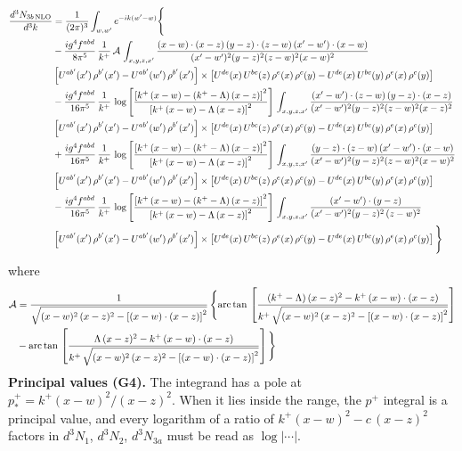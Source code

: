 \documentclass[9pt]{article}
\numberwithin{equation}{section}
\begin{document}
\begin{align}
\frac{d^{3}N_{3b\,\rm NLO}}{d^{3}k} & =\frac{1}{(2\pi)^{3}}\int_{w,w'}e^{-ik(w'-w)}\Bigg\{\notag \\ &-\frac{ig^{4}f^{abd}}{8\pi^{5}}\,\frac{1}{k^{+}}\,\mathcal{A}\,\int_{x,y,z,x'}
\frac{(x-w)\cdot(x-z)\,(y-z)\cdot(z-w)\,(x'-w')\cdot(x-w)}{(x'-w')^{2}(y-z)^{2}(z-w)^{2}(x-w)^{2}}\notag \\ & \left[U^{ab'}(x')\,\rho^{b'}(x')-U^{ab'}(w')\, \rho^{b'}(x')\right]\times \left[U^{de}(x)\,U^{bc}(z)\, \rho^{e}(x)\,\rho^{c}(y)-U^{de}(x)\,U^{bc}(y)\,\rho^{e}(x)\,\rho^{c}(y)\right]\notag \\ & -\frac{ig^{4}f^{abd}}{16\pi^{5}}\,\frac{1}{k^{+}}\,\log{\left[\frac{\left[k^{+}\,(x-w)-(k^{+}-\Lambda)\,(x-z)\right]^{2}}{\left[k^{+}\,(x-w)-\Lambda\,(x-z)\right]^{2}}\right]}\,\int_{x,y,z,x'}
\frac{(x'-w')\cdot(z-w)\,(y-z)\cdot(x-z)}{(x'-w')^{2}(y-z)^{2}(z-w)^{2}(x-z)^{2}}\notag \\
&\left[U^{ab'}(x')\,\rho^{b'}(x')-U^{ab'}(w')\, \rho^{b'}(x')\right]\times \left[U^{de}(x)\,U^{bc}(z)\, \rho^{e}(x)\,\rho^{c}(y)-U^{de}(x)\,U^{bc}(y)\,\rho^{e}(x)\,\rho^{c}(y)\right]\notag \\ &+ \frac{ig^{4}f^{abd}}{16\pi^{5}}\,\frac{1}{k^{+}}\,\log{\left[\frac{\left[k^{+}\,(x-w)-(k^{+}-\Lambda)\,(x-z)\right]^{2}}{\left[k^{+}\,(x-w)-\Lambda\,(x-z)\right]^{2}}\right]}\,\int_{x,y,z,x'}
\frac{(y-z)\cdot(z-w)\,(x'-w')\cdot(x-w)}{(x'-w')^{2}(y-z)^{2}(z-w)^{2}(x-w)^{2}}\notag \\ 
& \left[U^{ab'}(x')\,\rho^{b'}(x')-U^{ab'}(w')\, \rho^{b'}(x')\right]\times \left[U^{de}(x)\,U^{bc}(z)\, \rho^{e}(x)\,\rho^{c}(y)-U^{de}(x)\,U^{bc}(y)\,\rho^{e}(x)\,\rho^{c}(y)\right]\notag \\ & -\frac{ig^{4}f^{abd}}{16\pi^{5}}\,\frac{1}{k^{+}}\,\log{\left[\frac{\left[k^{+}\,(x-w)-(k^{+}-\Lambda)\,(x-z)\right]^{2}}{\left[k^{+}\,(x-w)-\Lambda\,(x-z)\right]^{2}}\right]}\,\int_{x,y,z,x'}
\frac{(x'-w')\cdot(y-z)}{(x'-w')^{2}(y-z)^{2}\,(z-w)^{2}}\notag \\ & \left[U^{ab'}(x')\,\rho^{b'}(x')-U^{ab'}(w')\, \rho^{b'}(x')\right]\times \left[U^{de}(x)\,U^{bc}(z)\, \rho^{e}(x)\,\rho^{c}(y)-U^{de}(x)\,U^{bc}(y)\,\rho^{e}(x)\,\rho^{c}(y)\right]\Bigg\}
\end{align}
where 
\begin{align}
\mathcal{A} & = \frac{1}{\sqrt{(x-w)^{2}\,(x-z)^{2}-\left[(x-w)\cdot (x-z)\right]^{2}}}\, \Bigg\{\mathrm{arc\,tan}\,\left[\frac{(k^{+}-\Lambda)\,(x-z)^{2}-k^{+}\,(x-w)\cdot (x-z)}{k^{+}\,\sqrt{(x-w)^{2}\,(x-z)^{2}-\left[(x-w)\cdot (x-z)\right]^{2}}}\right]\notag \\ & - \mathrm{arc\,tan}\,\left[\frac{\Lambda\,(x-z)^{2}-k^{+}\,(x-w)\cdot (x-z)}{k^{+}\,\sqrt{(x-w)^{2}\,(x-z)^{2}-\left[(x-w)\cdot (x-z)\right]^{2}}}\right] \Bigg\} \nonumber
\end{align}
\begingroup\color{blue}\noindent\textbf{Principal values (G4).} The integrand has a pole at $p^{+}_{*}=k^{+}(x-w)^{2}/(x-z)^{2}$. When it lies inside the range, the $p^{+}$ integral is a principal value, and every logarithm of a ratio of $k^{+}(x-w)^{2}-c\,(x-z)^{2}$ factors in $d^{3}N_{1}$, $d^{3}N_{2}$, $d^{3}N_{3a}$ must be read as $\log|\cdots|$.
\end{document}
